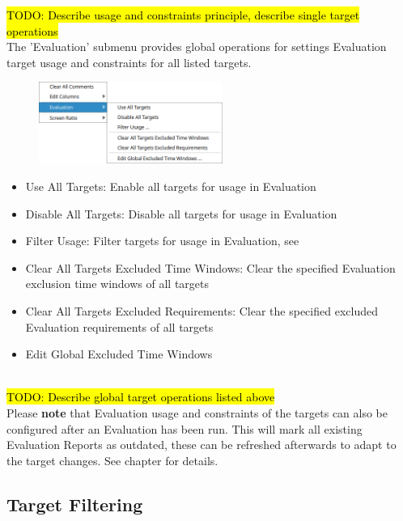 \hl{TODO: Describe usage and constraints principle, describe single target operations} \\

The 'Evaluation' submenu provides global operations for settings Evaluation target usage and constraints for all listed targets.

\begin{figure}[H]
  \center
  \includegraphics[width=6cm,frame]{figures/ui_targets_config_eval.png}
\end{figure}

\begin{itemize}
  \item Use All Targets: Enable all targets for usage in Evaluation
  \item Disable All Targets: Disable all targets for usage in Evaluation
  \item Filter Usage: Filter targets for usage in Evaluation, see 
  \item Clear All Targets Excluded Time Windows: Clear the specified Evaluation exclusion time windows of all targets
  \item Clear All Targets Excluded Requirements: Clear the specified excluded Evaluation requirements of all targets
  \item Edit Global Excluded Time Windows
\end{itemize} 
\ \\

\hl{TODO: Describe global target operations listed above} \\

Please \textbf{note} that Evaluation usage and constraints of the targets can also be configured after an Evaluation has been run.
This will mark all existing Evaluation Reports as outdated, these can be refreshed afterwards to adapt to the target changes.
See chapter  for details.

\subsection{Target Filtering}
\label{sec:ui_target_filtering}

